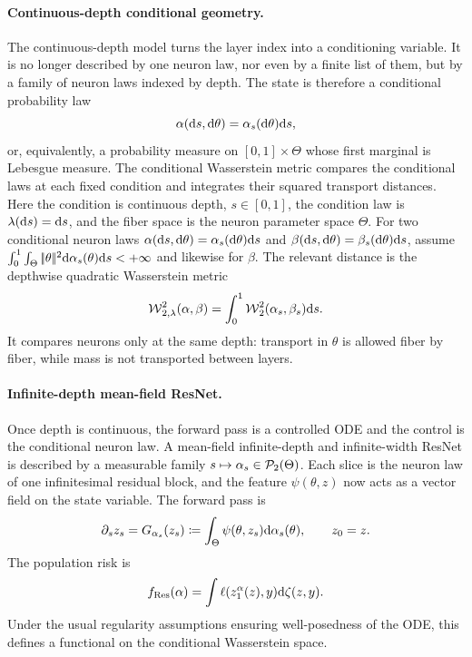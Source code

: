 \paragraph{Continuous-depth conditional geometry.}
The continuous-depth model turns the layer index into a conditioning variable. It is no longer described by one neuron law, nor even by a finite list of them, but by a family of neuron laws indexed by depth. The state is therefore a conditional probability law
\[
	\alpha(\mathrm{d} s,\mathrm{d}\theta)=\alpha_s(\mathrm{d}\theta)\mathrm{d} s,
\]
or, equivalently, a probability measure on $[0,1]\times\Theta$ whose first marginal is Lebesgue measure. The conditional Wasserstein metric compares the conditional laws at each fixed condition and integrates their squared transport distances. Here the condition is continuous depth, $s\in[0,1]$, the condition law is $\lambda(\mathrm{d} s)=\mathrm{d} s$, and the fiber space is the neuron parameter space $\Theta$. For two conditional neuron laws $\alpha(\mathrm{d} s,\mathrm{d}\theta)=\alpha_s(\mathrm{d}\theta)\mathrm{d} s$ and $\beta(\mathrm{d} s,\mathrm{d}\theta)=\beta_s(\mathrm{d}\theta)\mathrm{d} s$, assume $\int_0^1\int_\Theta|\!| \theta |\!|^2\mathrm{d}\alpha_s(\theta)\mathrm{d} s<+\infty$ and likewise for $\beta$. The relevant distance is the depthwise quadratic Wasserstein metric
\begin{equation}\label{eq-resnet-depth-wasserstein}
	\operatorname{\mathcal{W}}_{2,\lambda}^2(\alpha,\beta)
	=
	\int_0^1\operatorname{\mathcal{W}}_2^2(\alpha_s,\beta_s)\mathrm{d} s.
\end{equation}
It compares neurons only at the same depth: transport in $\theta$ is allowed fiber by fiber, while mass is not transported between layers.

\paragraph{Infinite-depth mean-field ResNet.}
Once depth is continuous, the forward pass is a controlled ODE and the control is the conditional neuron law. A mean-field infinite-depth and infinite-width ResNet is described by a measurable family $s\mapsto\alpha_s\in\mathcal{P}_2(\Theta)$. Each slice is the neuron law of one infinitesimal residual block, and the feature $\psi(\theta,z)$ now acts as a vector field on the state variable. The forward pass is
\begin{equation}\label{eq-mean-field-resnet-forward}
	\partial_s z_s
	=
	G_{\alpha_s}(z_s)
	\coloneqq
	\int_\Theta \psi(\theta,z_s)\mathrm{d}\alpha_s(\theta),
	\qquad z_0=z.
\end{equation}
The population risk is
\[
	f_{\mathrm{Res}}(\alpha)
	=
	\int \ell(z_1^\alpha(z),y)\mathrm{d}\zeta(z,y).
\]
Under the usual regularity assumptions ensuring well-posedness of the ODE, this defines a functional on the conditional Wasserstein space.


